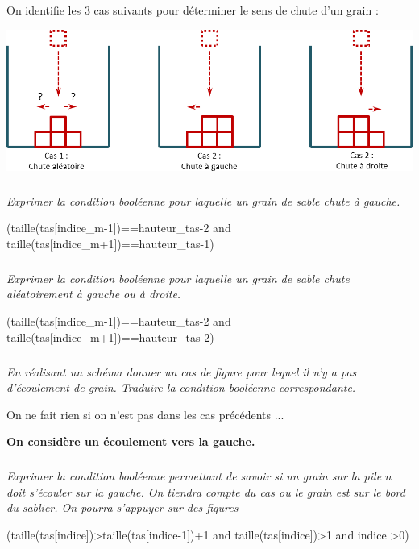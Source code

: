 \documentclass[10pt,fleqn]{article} %
\begin{document}
On identifie les 3 cas suivants pour déterminer le sens de chute d'un grain :
\begin{center}
\includegraphics[width=\linewidth]{images/sablier_03}
\end{center}
\fi

\subparagraph{}
\textit{Exprimer la condition booléenne pour laquelle un grain de sable chute à gauche.}
\ifprof
\begin{corrige}
\begin{python}
(taille(tas[indice_m-1])==hauteur_tas-2 and taille(tas[indice_m+1])==hauteur_tas-1)
\end{python}
\end{corrige}
\else
\fi

\subparagraph{}
\textit{Exprimer la condition booléenne pour laquelle un grain de sable chute aléatoirement à gauche ou à droite.}
\ifprof
\begin{corrige}
\begin{python}
(taille(tas[indice_m-1])==hauteur_tas-2 and taille(tas[indice_m+1])==hauteur_tas-2)
\end{python}
\end{corrige}
\else
\fi

\subparagraph{}
\textit{En réalisant un schéma donner un cas de figure pour lequel il n'y a pas d'écoulement de grain. Traduire la condition booléenne correspondante.}
\ifprof
\begin{corrige}
On ne fait rien si on n'est pas dans les cas précédents ...
\end{corrige}
\else
\fi

\textbf{On considère un écoulement vers la gauche.}

\subparagraph{}
\textit{Exprimer la condition booléenne permettant de savoir si un grain sur la pile $n$ doit s'écouler sur la gauche. On tiendra compte du cas ou le grain est sur le bord du sablier. On pourra s'appuyer sur des figures}
\ifprof
\begin{corrige}
\begin{python}
(taille(tas[indice])>taille(tas[indice-1])+1 and taille(tas[indice])>1 and indice >0)
\end{python}
\end{corrige}
\else
\fi
\end{document}
